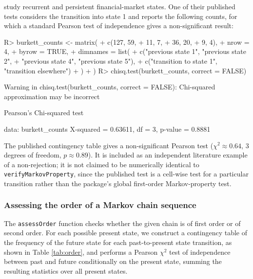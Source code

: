 \documentclass[
  nojss]{jss}
\begin{document}
\cite{burkett2019recurrent} study recurrent and persistent financial-market states. One of their published tests considers the transition into state 1 and reports the following counts, for which a standard Pearson test of independence gives a non-significant result:

\begin{CodeChunk}
\begin{CodeInput}
R> burkett_counts <- matrix(
+   c(127, 59,
+      11,  7,
+      36, 20,
+       9,  4),
+   nrow = 4,
+   byrow = TRUE,
+   dimnames = list(
+     c("previous state 1", "previous state 2",
+       "previous state 4", "previous state 5"),
+     c("transition to state 1", "transition elsewhere")
+   )
+ )
R> chisq.test(burkett_counts, correct = FALSE)
\end{CodeInput}
\begin{CodeOutput}
Warning in chisq.test(burkett_counts, correct = FALSE): Chi-squared
approximation may be incorrect
\end{CodeOutput}
\begin{CodeOutput}

    Pearson's Chi-squared test

data:  burkett_counts
X-squared = 0.63611, df = 3, p-value = 0.8881
\end{CodeOutput}
\end{CodeChunk}

The published contingency table gives a non-significant Pearson test (\(\chi^2\approx0.64\), 3 degrees of freedom, \(p\approx0.89\)). It is included as an independent literature example of a non-rejection; it is not claimed to be numerically identical to \texttt{verifyMarkovProperty}, since the published test is a cell-wise test for a particular transition rather than the package's global first-order Markov-property test.

\subsubsection{Assessing the order of a Markov chain sequence}\label{assessing-the-order-of-a-markov-chain-sequence}

The \texttt{assessOrder} function checks whether the given chain is of first order or of second order. For each possible present state, we construct a contingency table of the frequency of the future state for each past-to-present state transition, as shown in Table \ref{tab:order}, and performs a Pearson \(\chi^2\) test of independence between past and future conditionally on the present state, summing the resulting statistics over all present states.
\end{document}
